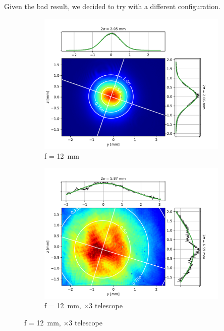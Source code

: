 Given the bad result, we decided to try with a different configuration.

\begin{figure}[p]
    \begin{subfigure}{0.5\textwidth}
        \centering
        \includegraphics[width=\textwidth]{chapters/chapter_3/figures/beam_f12.pdf}
        \caption{f = \SI{12}{mm}}
        \label{fig:beam_f12}
    \end{subfigure}
    \begin{subfigure}{0.5\textwidth}
        \centering
        \includegraphics[width=\textwidth]{chapters/chapter_3/figures/beam_f12x3.pdf}
        \caption{f = \SI{12}{mm}, $\times3$ telescope}
        \label{fig:beam_f12x3}

\end{subfigure}
\end{figure}
